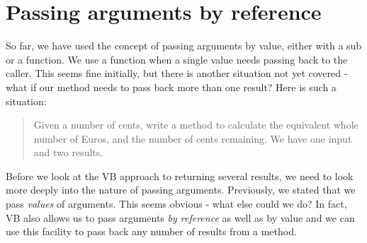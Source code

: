 	\section{Passing arguments by reference}
		So far, we have used the concept of passing arguments by value, either with a sub or a function. We use a function when a single value needs passing back to the caller. This seems fine initially, but there is another situation not yet covered - what if our method needs to pass back more than one result? Here is such a situation:
		\begin{quote}
			Given a number of cents, write a method to calculate the equivalent whole number of Euros, and the number of cents remaining. We have one input and two results.
		\end{quote}
		Before we look at the VB approach to returning several results, we need to look more deeply into the nature of passing arguments. Previously, we stated that we pass \emph{values} of arguments. This seems obvious - what else could we do? In fact, VB also allows us to pass arguments \emph{by reference} as well as by value and we can use this facility to pass back any number of results from a method.
		
